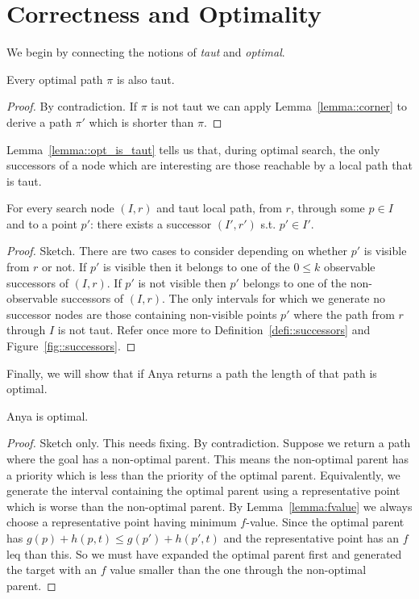\section{Correctness and Optimality}
We begin by connecting the notions of \emph{taut} and \emph{optimal}.
\begin{lemm}
\label{lemma::opt_is_taut}
Every optimal path $\pi$ is also taut.
\end{lemm}
\begin{proof}
By contradiction. If $\pi$ is not taut we can apply 
Lemma~\ref{lemma::corner} to derive a path $\pi'$ which is 
shorter than $\pi$. 
\end{proof}
Lemma~\ref{lemma::opt_is_taut} tells us that,
during optimal search, the only successors of a node which
are interesting are those reachable by a local path that is taut.
\begin{lemm}
For every search node $(I, r)$ and
taut local path, from $r$, through some $p \in I$
and to a point $p'$: there exists
a successor $(I', r')$ s.t. $p' \in I'$.
\end{lemm}
\begin{proof}
Sketch. There are two cases to consider depending on whether
$p'$ is visible from $r$ or not.
If $p'$ is visible then it belongs to one of the $0 \leq k$ observable 
successors of $(I, r)$. 
If $p'$ is not visible then $p'$ belongs to one of the non-observable
successors of $(I, r)$. 
The only intervals for which we generate no successor nodes are those
containing non-visible points $p'$ where the path from $r$ through 
$I$ is not taut. Refer once more to Definition~\ref{defi::successors} and Figure~\ref{fig::successors}. 
\end{proof}
Finally, we will show that if Anya returns a path the length
of that path is optimal.
\begin{theorem}
Anya is optimal.
\end{theorem}
\begin{proof}
Sketch only. This needs fixing.
By contradiction. Suppose we return a path where
the goal has a non-optimal parent. 
This means the non-optimal parent has a priority
which is less than the priority of the optimal parent.
Equivalently, we generate the interval containing the 
optimal parent using a representative point which is
worse than the non-optimal parent.
By Lemma~\ref{lemma:fvalue} we always choose a representative
point having minimum $f$-value.
Since the optimal parent has $g(p) + h(p, t) \leq g(p') + h(p', t)$
and the representative point has an $f$ leq than this.
So we must have expanded the optimal parent first and generated
the target with an $f$ value smaller than  the one through 
the non-optimal parent.
\end{proof}

